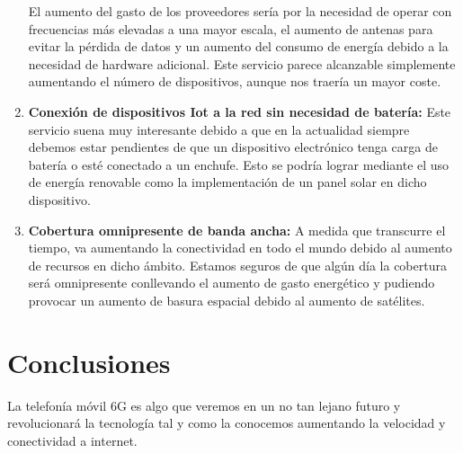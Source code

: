 \begin{enumerate}
El aumento del gasto de los proveedores sería por la necesidad de operar con frecuencias más elevadas a una mayor escala, el aumento de antenas para evitar la pérdida de datos y un aumento del consumo de energía debido a la necesidad de hardware adicional. Este servicio parece alcanzable simplemente aumentando el número de dispositivos, aunque nos traería un mayor coste.
\item {\bfseries Conexión de dispositivos Iot a la red sin necesidad de batería:  }
Este servicio suena muy interesante debido a que en la actualidad siempre debemos estar pendientes de que un dispositivo electrónico tenga carga de batería o esté conectado a un enchufe. Esto se podría lograr mediante el uso de energía renovable como la implementación de un panel solar en dicho dispositivo.
\item {\bfseries Cobertura omnipresente de banda ancha:  }
A medida que transcurre el tiempo, va aumentando la conectividad en todo el mundo debido al aumento de recursos en dicho ámbito. Estamos seguros de que algún día la cobertura será omnipresente conllevando el aumento de gasto energético y pudiendo provocar un aumento de basura espacial debido al aumento de satélites.
\end{enumerate}

\section{Conclusiones}
\label{sec:conclusiones}
La telefonía móvil 6G es algo que veremos en un no tan lejano futuro y revolucionará la tecnología tal y como la conocemos aumentando la velocidad y conectividad a internet\cite{AMI}.

          





